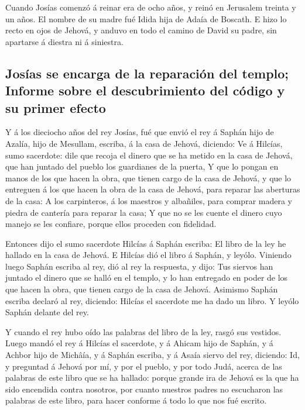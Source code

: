  Cuando Josías comenzó á reinar era de ocho años, y reinó
en Jerusalem treinta y un años. El nombre de su madre fué Idida hija de
Adaía de Boscath.  E hizo lo recto en ojos de Jehová, y
anduvo en todo el camino de David su padre, sin apartarse á diestra ni á
siniestra.

\hypertarget{josuxedas-se-encarga-de-la-reparaciuxf3n-del-templo-informe-sobre-el-descubrimiento-del-cuxf3digo-y-su-primer-efecto}{%
\subsection{Josías se encarga de la reparación del templo; Informe sobre
el descubrimiento del código y su primer
efecto}\label{josuxedas-se-encarga-de-la-reparaciuxf3n-del-templo-informe-sobre-el-descubrimiento-del-cuxf3digo-y-su-primer-efecto}}

 Y á los dieciocho años del rey Josías, fué que envió el
rey á Saphán hijo de Azalía, hijo de Mesullam, escriba, á la casa de
Jehová, diciendo:  Ve á Hilcías, sumo sacerdote: dile que
recoja el dinero que se ha metido en la casa de Jehová, que han juntado
del pueblo los guardianes de la puerta,  Y que lo pongan
en manos de los que hacen la obra, que tienen cargo de la casa de
Jehová, y que lo entreguen á los que hacen la obra de la casa de Jehová,
para reparar las aberturas de la casa:  A los carpinteros,
á los maestros y albañiles, para comprar madera y piedra de cantería
para reparar la casa;  Y que no se les cuente el dinero
cuyo manejo se les confiare, porque ellos proceden con fidelidad.

 Entonces dijo el sumo sacerdote Hilcías á Saphán escriba:
El libro de la ley he hallado en la casa de Jehová. E Hilcías dió el
libro á Saphán, y leyólo.  Viniendo luego Saphán escriba
al rey, dió al rey la respuesta, y dijo: Tus siervos han juntado el
dinero que se halló en el templo, y lo han entregado en poder de los que
hacen la obra, que tienen cargo de la casa de Jehová. 
Asimismo Saphán escriba declaró al rey, diciendo: Hilcías el sacerdote
me ha dado un libro. Y leyólo Saphán delante del rey.

 Y cuando el rey hubo oído las palabras del libro de la
ley, rasgó sus vestidos.  Luego mandó el rey á Hilcías el
sacerdote, y á Ahicam hijo de Saphán, y á Achbor hijo de Michâía, y á
Saphán escriba, y á Asaía siervo del rey, diciendo:  Id,
y preguntad á Jehová por mí, y por el pueblo, y por todo Judá, acerca de
las palabras de este libro que se ha hallado: porque grande ira de
Jehová es la que ha sido encendida contra nosotros, por cuanto nuestros
padres no escucharon las palabras de este libro, para hacer conforme á
todo lo que nos fué escrito.

